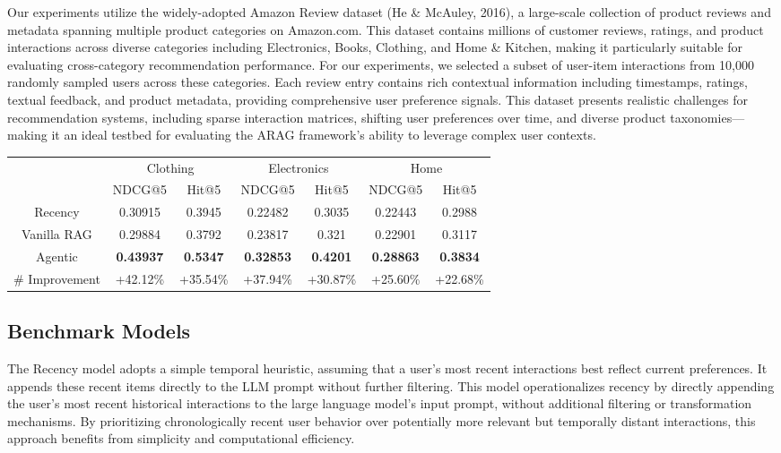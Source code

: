 \documentclass[sigconf]{acmart}
\begin{document}
Our experiments utilize the widely-adopted Amazon Review dataset (He \& McAuley, 2016), a large-scale collection of product reviews and metadata spanning multiple product categories on Amazon.com. This dataset contains millions of customer reviews, ratings, and product interactions across diverse categories including Electronics, Books, Clothing, and Home \& Kitchen, making it particularly suitable for evaluating cross-category recommendation performance. For our experiments, we selected a subset of user-item interactions from 10,000 randomly sampled users across these categories. Each review entry contains rich contextual information including timestamps, ratings, textual feedback, and product metadata, providing comprehensive user preference signals. This dataset presents realistic challenges for recommendation systems, including sparse interaction matrices, shifting user preferences over time, and diverse product taxonomies—making it an ideal testbed for evaluating the ARAG framework's ability to leverage complex user contexts.

\begin{table}[ht]
\centering
\begin{tabular}{c|cc|cc|cc}
& \multicolumn{2}{c|}{ Clothing} & \multicolumn{2}{c|}{ Electronics} & \multicolumn{2}{c}{ Home} \\
& NDCG@5 & Hit@5 & NDCG@5 & Hit@5 & NDCG@5 & Hit@5 \\
\hline
\hline
Recency & 0.30915 & 0.3945 & 0.22482 & 0.3035 & 0.22443 & 0.2988 \\
Vanilla RAG& 0.29884 & 0.3792 & 0.23817 & 0.321 & 0.22901 & 0.3117 \\
\hline
\hline
Agentic & \textbf{0.43937} & \textbf{0.5347} & \textbf{0.32853} & \textbf{0.4201} & \textbf{0.28863} & \textbf{0.3834} \\
\# Improvement & +42.12\% & +35.54\% & +37.94\% & +30.87\% & +25.60\% & +22.68\% \\
\end{tabular}
\end{table}

\fi


\subsection{Benchmark Models}

The Recency model adopts a simple temporal heuristic, assuming that a user's most recent interactions best reflect current preferences. It appends these recent items directly to the LLM prompt without further filtering. This model operationalizes recency by directly appending the user's most recent historical interactions to the large language model's input prompt, without additional filtering or transformation mechanisms. By prioritizing chronologically recent user behavior over potentially more relevant but temporally distant interactions, this approach benefits from simplicity and computational efficiency.
\end{document}
